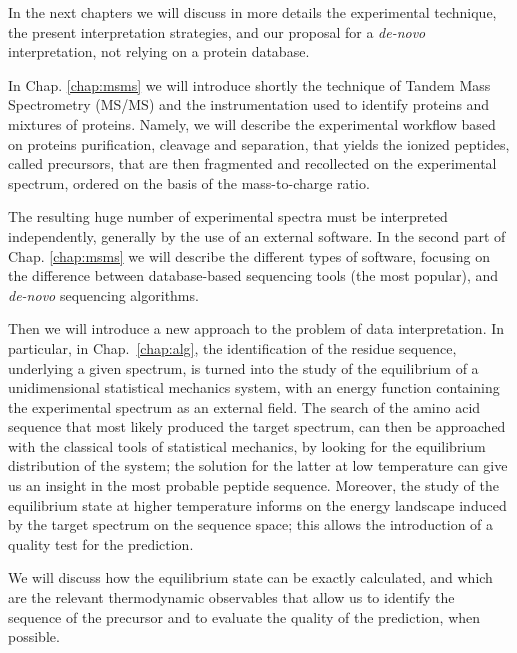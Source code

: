 In the next chapters we will discuss in more details the experimental technique,
the present interpretation strategies, and our proposal for a \emph{de-novo}
interpretation, not relying on a protein database.


In Chap. \ref{chap:msms} we will introduce shortly the technique of Tandem
Mass Spectrometry (MS/MS) and the instrumentation used to identify proteins
and mixtures of proteins.
Namely, we will describe the experimental workflow based on proteins
purification, cleavage and separation, that yields
the ionized peptides, called precursors, that are then fragmented and
recollected on the experimental spectrum, ordered on the basis of the
mass-to-charge ratio.

The resulting huge number of experimental spectra must be
interpreted independently, generally by the use of an external software.
In the second part of Chap. \ref{chap:msms} we will describe the different types
of software,
focusing on the difference between database-based sequencing tools (the most
popular),
and \emph{de-novo} sequencing algorithms.

Then we will introduce a new approach to the problem of data interpretation.
In particular, in Chap.~\ref{chap:alg}, the identification of the
residue sequence, underlying a given spectrum, is turned into the study of the 
equilibrium of a
unidimensional statistical mechanics system,
with an energy function containing the experimental spectrum as an external field.
The search of the amino acid sequence that most likely produced the
target spectrum, can then be approached with the classical tools of
statistical mechanics, by looking for the equilibrium distribution
of the system; the solution for
the latter at low
temperature can give us an insight in the most probable peptide sequence.
Moreover, the study of the equilibrium state at higher temperature informs 
on the energy landscape induced by the target spectrum on the sequence space; 
this allows the introduction of a quality test for the prediction.

We will discuss how the equilibrium state can be exactly calculated, and which
are the relevant thermodynamic observables that allow us to identify the
sequence of the precursor and to evaluate the quality of the prediction, when
possible.

